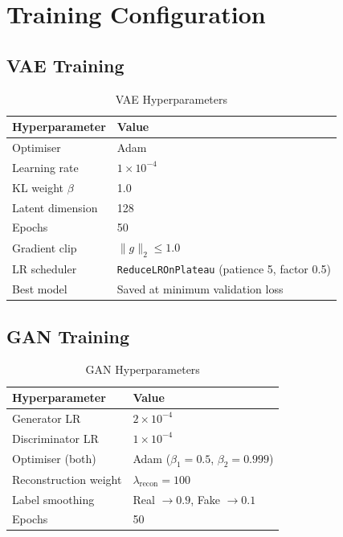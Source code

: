 \documentclass[12pt,a4paper]{article}
\begin{document}
\section{Training Configuration}
\label{sec:training}

\subsection{VAE Training}

\begin{table}[H]
\centering
\caption{VAE Hyperparameters}
\begin{tabular}{ll}
\toprule
\textbf{Hyperparameter}  & \textbf{Value} \\
\midrule
Optimiser                & Adam \\
Learning rate            & $1\times10^{-4}$ \\
KL weight $\beta$        & 1.0 \\
Latent dimension         & 128 \\
Epochs                   & 50 \\
Gradient clip            & $\|g\|_2\le1.0$ \\
LR scheduler             & \texttt{ReduceLROnPlateau} (patience 5, factor 0.5) \\
Best model               & Saved at minimum validation loss \\
\bottomrule
\end{tabular}
\end{table}

\subsection{GAN Training}

\begin{table}[H]
\centering
\caption{GAN Hyperparameters}
\begin{tabular}{ll}
\toprule
\textbf{Hyperparameter}      & \textbf{Value} \\
\midrule
Generator LR                 & $2\times10^{-4}$ \\
Discriminator LR             & $1\times10^{-4}$ \\
Optimiser (both)             & Adam ($\beta_1=0.5$, $\beta_2=0.999$) \\
Reconstruction weight        & $\lambda_{\mathrm{recon}}=100$ \\
Label smoothing              & Real $\to 0.9$, Fake $\to 0.1$ \\
Epochs                       & 50 \\
\bottomrule
\end{tabular}
\end{table}
\end{document}
